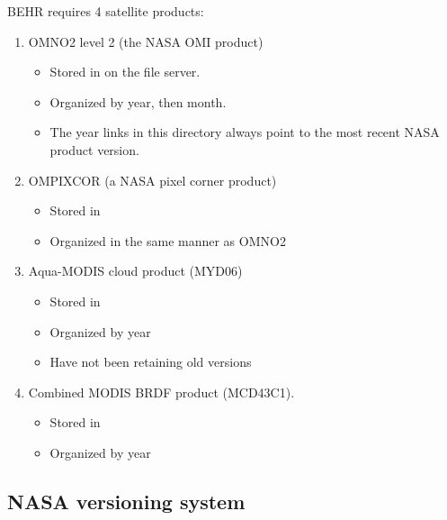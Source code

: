 \documentclass[12pt]{article}
\begin{document}
		BEHR requires 4 satellite products:
		\begin{enumerate}
		\item OMNO2 level 2 (the NASA OMI  product)
			\begin{itemize}
			\item Stored in  on the file server. 
			\item Organized by year, then month.
			\item The year links in this directory always point to the most recent NASA product version.
			\end{itemize}
			
		\item OMPIXCOR (a NASA pixel corner product)
			\begin{itemize}
			\item Stored in 
			\item Organized in the same manner as OMNO2
			\end{itemize}
			
		\item Aqua-MODIS cloud product (MYD06)
			\begin{itemize}
			\item Stored in 
			\item Organized by year
			\item Have not been retaining old versions
			\end{itemize}
			
		\item Combined MODIS BRDF product (MCD43C1).
			\begin{itemize}
			\item Stored in 
			\item Organized by year
			\end{itemize}
		\end{enumerate}
	
	\subsection{NASA versioning system}
	
\end{document}
